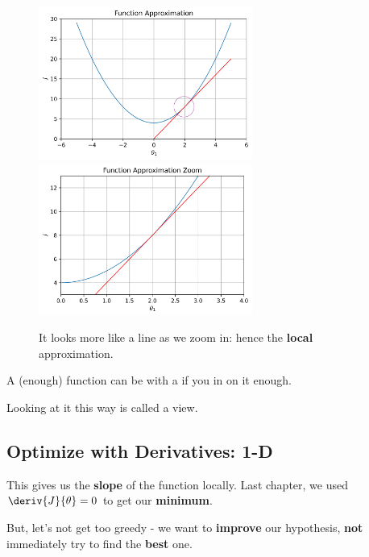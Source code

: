         \begin{figure}[H]
            \includegraphics[width=70mm,scale=0.5]{images/gradient_descent_images/function_approximation_linear.png}
            \includegraphics[width=70mm,scale=0.5]{images/gradient_descent_images/function_approximation_linear_zoom.png}
            
            \caption*{It looks more like a line as we zoom in: hence the \textbf{local} approximation.}
        \end{figure}
        
        
        \begin{concept}
            A  (enough) function can be  with a  if you  in on it enough.
            
            Looking at it this way is called a  view.
        \end{concept}
        
        
        
    \subsection{Optimize with Derivatives: 1-D}
        
        This gives us the \textbf{slope} of the function locally. Last chapter, we used $\deriv{J}{\theta}=0$ to get our \textbf{minimum}.
        
        But, let's not get too greedy - we want to \textbf{improve} our hypothesis, \textbf{not} immediately try to find the \textbf{best} one.
        
